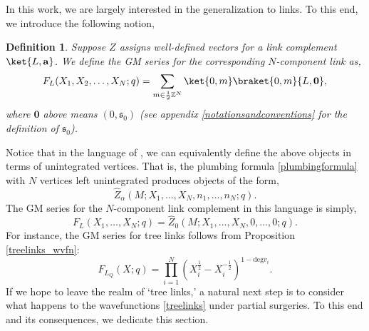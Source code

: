 \documentclass{article}
\newcommand{\Z}{{\mathbb Z}}
\newtheorem{definition}{Definition}
\numberwithin{corollary}{theorem}
\numberwithin{corollary}{proposition}
\begin{document}
In this work, we are largely interested in the generalization to links. To this end, we introduce the following notion, 
\begin{definition} Suppose $Z$ assigns well-defined vectors for a link complement $\ket{L,\mathbf{a}}$. We define the GM series for the corresponding $N$-component link as, 
$$F_L(X_1,X_2,\ldots,X_N;q) = \sum_{m\in \frac{1}{2}\Z^N} \ket{0,m} \braket{0,m}{L,\mathbf{0}},$$
where $\mathbf{0}$ above means $(0,\mathfrak{s}_0)$ (see appendix \ref{notationsandconventions} for the definition of $\mathfrak{s}_{0}$). 
\end{definition}
Notice that in the language of \cite{GM}, we can equivalently define the above objects in terms of unintegrated vertices. That is, the plumbing formula \eqref{plumbingformula} with $N$ vertices left unintegrated produces objects of the form,
$$\hat{Z}_{\alpha} (M;X_1,\ldots,X_N,n_1,\ldots,n_N;q).$$
The GM series for the $N$-component link complement in this language is simply, 
$$F_L(X_1,\ldots,X_N;q) = \hat{Z}_{0} (M;X_1,\ldots,X_N,0,\ldots,0;q).$$
For instance, the GM series for tree links follows from Proposition \ref{treelinks_wvfn}:
$$F_{L_Q}(X;q) = \prod^N_{i=1}(X_i^{\frac{1}{2}} - X_i^{-\frac{1}{2}})^{1-\mathrm{deg} v_i}.$$
If we hope to leave the realm of `tree links,' a natural next step is to consider what happens to the wavefunctions \eqref{treelinks} under partial surgeries. To this end and its consequences, we dedicate this section. 
\end{document}

